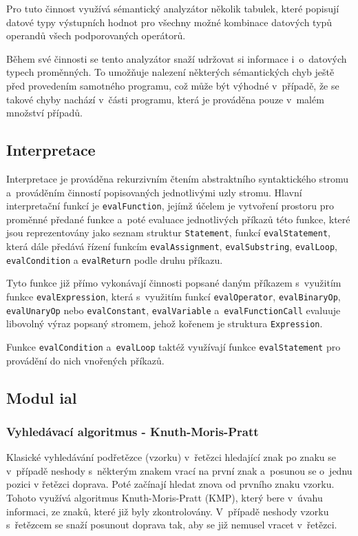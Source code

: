 \documentclass[12pt,a4paper,titlepage,final]{article}
\begin{document}
Pro tuto činnost využívá sémantický analyzátor několik tabulek, které 
popisují datové typy výstupních hodnot pro všechny možné kombinace 
datových typů operandů všech podporovaných operátorů.

Během své činnosti se tento analyzátor snaží udržovat si informace 
i~o~datových typech proměnných. To umožňuje nalezení některých sémantických 
chyb ještě před provedením samotného programu, což může být výhodné 
v~případě, že se takové chyby nachází v~části programu, která je prováděna 
pouze v~malém množství případů.
\subsection{Interpretace}
Interpretace je prováděna rekurzivním čtením abstraktního syntaktického stromu 
a~prováděním činností popisovaných jednotlivými uzly stromu. 
Hlavní interpretační funkcí je \texttt{evalFunction}, jejímž účelem je 
vytvoření prostoru pro proměnné předané funkce a~poté evaluace jednotlivých 
příkazů této funkce, které jsou reprezentovány jako seznam struktur \texttt{Statement}, 
funkcí \texttt{evalStatement}, která dále předává řízení funkcím 
\texttt{evalAssignment}, \texttt{evalSubstring}, \texttt{evalLoop}, 
\texttt{evalCondition} a \texttt{evalReturn} podle druhu příkazu.

Tyto funkce již přímo vykonávají činnosti popsané daným příkazem 
s~využitím funkce \texttt{evalExpression}, která s~využitím funkcí \texttt{evalOperator}, 
\texttt{evalBinaryOp}, \texttt{evalUnaryOp} nebo \texttt{evalConstant}, \texttt{evalVariable} 
a~\texttt{evalFunctionCall} evaluuje libovolný výraz popsaný stromem, 
jehož kořenem je struktura \texttt{Expression}.

Funkce \texttt{evalCondition} a~\texttt{evalLoop} taktéž využívají funkce 
\texttt{evalStatement} pro provádění do nich vnořených příkazů.
\subsection{Modul ial}
\subsubsection{Vyhledávací algoritmus - Knuth-Moris-Pratt}
Klasické vyhledávání podřetězce (vzorku) v~řetězci hledající znak po znaku se 
v~případě neshody s~některým znakem vrací na první znak a~posunou se o~jednu 
pozici v řetězci doprava. Poté začínají hledat znova od prvního znaku vzorku. 
Tohoto využívá algoritmus Knuth-Moris-Pratt (KMP), který bere v~úvahu informaci, 
ze znaků, které již byly zkontrolovány. V~případě neshody vzorku s~řetězcem se 
snaží posunout doprava tak, aby se již nemusel vracet v~řetězci.
\end{document}
